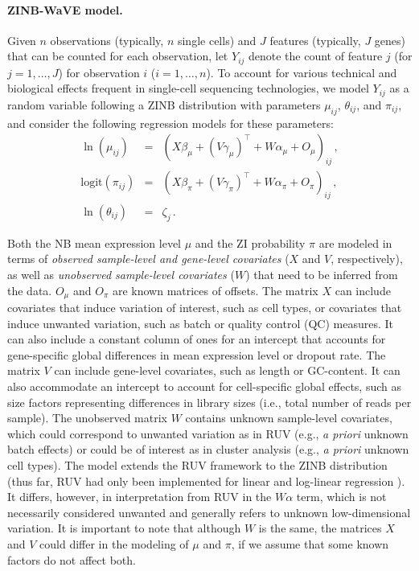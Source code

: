 \documentclass{bmcart}
\begin{document}
\paragraph{ZINB-WaVE model.}

Given $n$ observations (typically, $n$ single cells) and $J$ features
(typically, $J$ genes) that can be counted for each observation, let
$Y_{ij}$ denote the count of feature $j$ (for $j=1,\ldots,J$) for
observation $i$ ($i=1,\ldots,n$). To account for various technical and
biological effects frequent in single-cell sequencing
technologies, we model $Y_{ij}$ as a random variable following a ZINB distribution with parameters $\mu_{ij}$, $\theta_{ij}$, and $\pi_{ij}$, and consider the following regression models for these parameters:
\begin{eqnarray}
\label{e:zinbwave}
\ln(\mu_{ij}) &=& \left( X\beta_\mu + (V\gamma_\mu)^\top + W\alpha_\mu + O_\mu\right)_{ij}\,,\\
\text{logit}(\pi_{ij}) &=& \left(X\beta_\pi + (V\gamma_\pi)^\top + W\alpha_\pi + O_\pi\right)_{ij} \,, 
\nonumber\\		
\ln(\theta_{ij}) &=& \zeta_j \,. \nonumber
\end{eqnarray}

Both the NB mean expression level $\mu$ and the ZI probability $\pi$ are modeled in terms of \textit{observed sample-level and gene-level covariates} ($X$ and $V$, respectively), as well as \textit{unobserved sample-level covariates} ($W$) that need to be inferred from the data. $O_\mu$ and $O_\pi$ are known matrices of offsets. The matrix $X$ can include covariates that induce variation of interest, such as cell types, or covariates that induce unwanted variation, such as batch or quality control (QC) measures. It can also include a constant column of ones for an intercept that accounts for gene-specific global differences in mean expression level or dropout rate. The matrix $V$ can include gene-level covariates, such as length or GC-content. It can also accommodate an intercept to account for cell-specific global effects, such as size factors representing differences in library sizes (i.e., total number of reads per sample). The unobserved matrix $W$ contains unknown sample-level covariates, which could correspond to unwanted variation as in RUV \citep{Gagnon-Bartsch2012, Risso2014NormalizationSamples} (e.g., \textit{a priori} unknown batch effects) or could be of interest as in cluster analysis (e.g., \textit{a priori} unknown cell types). The model extends the RUV framework to the ZINB distribution (thus far, RUV had only been implemented for linear \citep{Gagnon-Bartsch2012} and log-linear regression \citep{Risso2014NormalizationSamples}). It differs, however, in interpretation from RUV in the $W\alpha$ term, which is not necessarily considered unwanted and generally refers to unknown low-dimensional variation. It is important to note that although $W$ is the same, the matrices $X$ and $V$ could differ in the modeling of $\mu$ and $\pi$, if we assume that some known factors do not affect both. 
\end{document}

